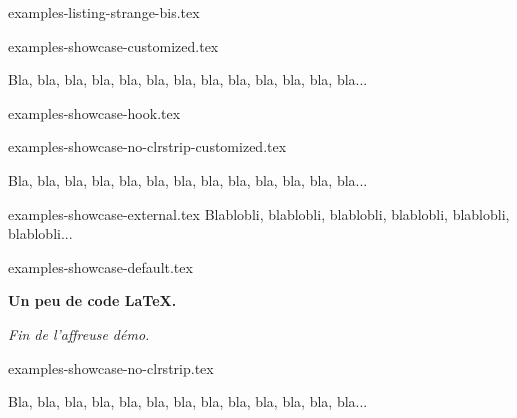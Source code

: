 \begin{filecontents*}[overwrite]{examples-listing-strange-bis.tex}
\begin{tdoclatex}
\end{tdoclatex}
\end{filecontents*}


\begin{filecontents*}[overwrite]{examples-showcase-customized.tex}
\begin{tdocshowcase}[before = Mon début,
                     after  = Ma fin à moi,
                     color  = red]
    Bla, bla, bla, bla, bla, bla, bla, bla, bla, bla, bla, bla, bla...
\end{tdocshowcase}
\end{filecontents*}


\begin{filecontents*}[overwrite]{examples-showcase-hook.tex}
\begin{tdocshowcase}
\end{tdocshowcase}
\end{filecontents*}


\begin{filecontents*}[overwrite]{examples-showcase-no-clrstrip-customized.tex}
\begin{tdocshowcase}[nostripe,
                     before = Mon début,
                     after  = Ma fin à moi,
                     color  = green]
    Bla, bla, bla, bla, bla, bla, bla, bla, bla, bla, bla, bla, bla...
\end{tdocshowcase}
\end{filecontents*}


\begin{filecontents*}[overwrite]{examples-showcase-external.tex}
Blablobli, blablobli, blablobli, blablobli, blablobli, blablobli...
\end{filecontents*}


\begin{filecontents*}[overwrite]{examples-showcase-default.tex}
\begin{tdocshowcase}
    \bfseries Un peu de code \LaTeX.

    \bigskip

    \emph{\large Fin de l'affreuse démo.}
\end{tdocshowcase}
\end{filecontents*}


\begin{filecontents*}[overwrite]{examples-showcase-no-clrstrip.tex}
\begin{tdocshowcase}[nostripe]
    Bla, bla, bla, bla, bla, bla, bla, bla, bla, bla, bla, bla, bla...
\end{tdocshowcase}
\end{filecontents*}


